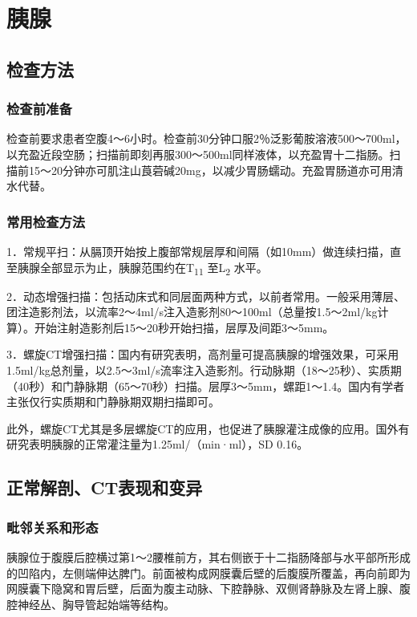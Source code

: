 \chapter{胰腺}

\section{检查方法}

\subsection{检查前准备}

检查前要求患者空腹4～6小时。检查前30分钟口服2％泛影葡胺溶液500～700ml，以充盈近段空肠；扫描前即刻再服300～500ml同样液体，以充盈胃十二指肠。扫描前15～20分钟亦可肌注山莨菪碱20mg，以减少胃肠蠕动。充盈胃肠道亦可用清水代替。

\subsection{常用检查方法}

1．常规平扫：从膈顶开始按上腹部常规层厚和间隔（如10mm）做连续扫描，直至胰腺全部显示为止，胰腺范围约在T\textsubscript{11}
至L\textsubscript{2} 水平。

2．动态增强扫描：包括动床式和同层面两种方式，以前者常用。一般采用薄层、团注造影剂法，以流率2～4ml/s注入造影剂80～100ml（总量按1.5～2ml/kg计算）。开始注射造影剂后15～20秒开始扫描，层厚及间距3～5mm。

3．螺旋CT增强扫描：国内有研究表明，高剂量可提高胰腺的增强效果，可采用1.5ml/kg总剂量，以2.5～3ml/s流率注入造影剂。行动脉期（18～25秒）、实质期（40秒）和门静脉期（65～70秒）扫描。层厚3～5mm，螺距1～1.4。国内有学者主张仅行实质期和门静脉期双期扫描即可。

此外，螺旋CT尤其是多层螺旋CT的应用，也促进了胰腺灌注成像的应用。国外有研究表明胰腺的正常灌注量为1.25ml/（min·ml），SD
0.16。

\section{正常解剖、CT表现和变异}

\subsection{毗邻关系和形态}

胰腺位于腹膜后腔横过第1～2腰椎前方，其右侧嵌于十二指肠降部与水平部所形成的凹陷内，左侧端伸达脾门。前面被构成网膜囊后壁的后腹膜所覆盖，再向前即为网膜囊下隐窝和胃后壁，后面为腹主动脉、下腔静脉、双侧肾静脉及左肾上腺、腹腔神经丛、胸导管起始端等结构。

